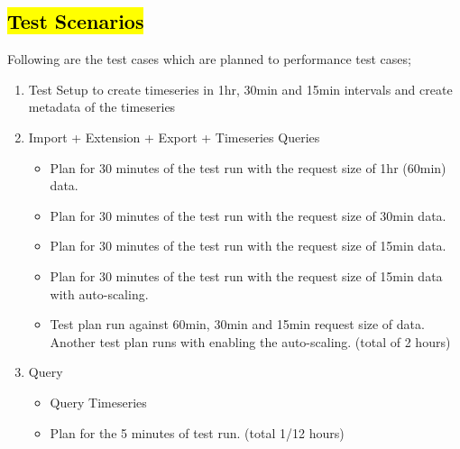 \subsection{\hl{Test Scenarios}}
\label{subse:test_plan_flow}
Following are the test cases which are planned to performance test cases;
\begin{enumerate}
    \item Test Setup to create timeseries in 1hr, 30min and 15min intervals and create metadata of the timeseries
    \item Import + Extension + Export + Timeseries Queries
    \begin{itemize}
        \item Plan for 30 minutes of the test run with the request size of 1hr (60min) data.
        \item Plan for 30 minutes of the test run with the request size of 30min data.
        \item Plan for 30 minutes of the test run with the request size of 15min data.
        \item Plan for 30 minutes of the test run with the request size of 15min data with auto-scaling.
        \item Test plan run against 60min, 30min and 15min request size of data. Another test plan runs with enabling the auto-scaling. (total of 2 hours)
    \end{itemize}
    \item Query
    \begin{itemize}
        \item Query Timeseries
        \item Plan for the 5 minutes of test run. (total 1/12 hours)
    \end{itemize}
\end{enumerate}


